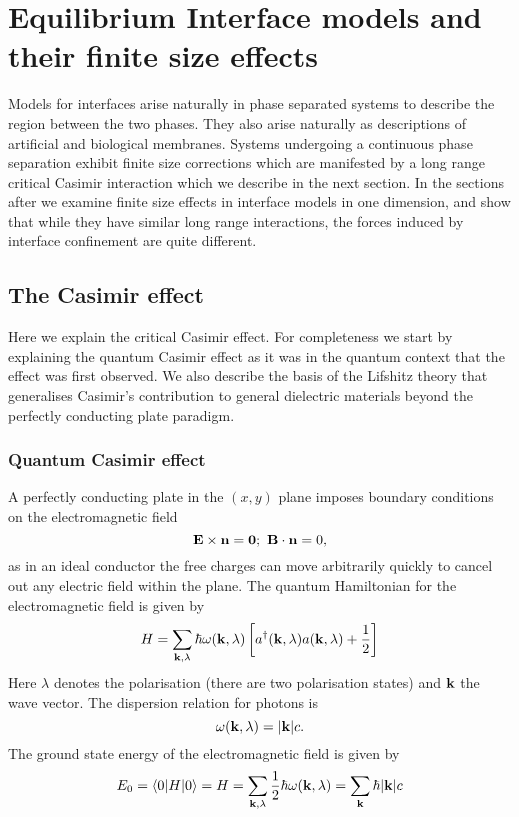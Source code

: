 
\chapter{Equilibrium Interface models and their finite size effects}
Models for interfaces arise naturally in phase separated systems to describe the region between the two phases. They also arise naturally as descriptions of artificial and biological membranes. Systems undergoing a continuous phase separation exhibit finite size corrections which are manifested by a long range critical Casimir interaction which we describe in the next section. In the sections after we examine finite size effects in interface models in one dimension, and show that while they have similar long range interactions, the forces induced by interface confinement are quite different.
\section{The Casimir effect}
Here we explain the critical Casimir effect. For completeness we start by explaining the quantum Casimir effect as it was in the quantum context that the effect was first observed.
We also describe the basis of the Lifshitz theory that generalises Casimir's contribution to 
general dielectric materials beyond the perfectly conducting plate paradigm.
\subsection{Quantum Casimir effect}
A perfectly  conducting plate in the $(x,y)$ plane imposes boundary conditions on the electromagnetic field
\begin{equation}
{\bf E}\times {\bf n} = {\bf 0};\ {\bf B}\cdot {\bf n} = 0,
\end{equation}
as in an ideal conductor the free charges can move arbitrarily quickly to cancel out any electric field within the plane. 
The quantum Hamiltonian for the electromagnetic field is given by 
\begin{equation}
H = \sum_{{\bf k},\lambda}\hbar \omega({\bf k},\lambda)\left[a^\dagger({\bf k},\lambda)a({\bf k},\lambda) + {1\over 2}\right]
\end{equation}
Here $\lambda$ denotes the polarisation (there are two polarisation states) and ${\bf k}$ the wave vector. The dispersion 
relation for photons is
\begin{equation}
\omega({\bf k},\lambda) = |{\bf k}|c.
\end{equation}
The ground state energy of the electromagnetic field is given by
\begin{equation}
E_0 = \langle 0|H|0\rangle = H = \sum_{{\bf k},\lambda}{1\over 2}\hbar \omega({\bf k},\lambda)= \sum_{\bf k}\hbar |{\bf k}|c
\end{equation}

